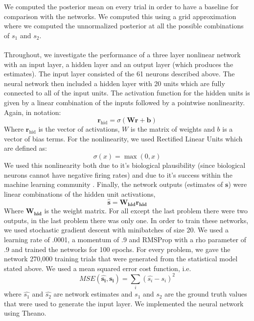 \documentclass{article} %
\begin{document}
We computed the posterior mean on every trial in order to have a baseline for comparison with the networks. We computed this using a grid approximation where we computed the unnormalized posterior at all the possible combinations of $s_1$ and $s_2$.
\\
\\
Throughout, we investigate the performance of a three layer nonlinear network with an input layer, a hidden layer and an output layer (which produces the estimates). The input layer consisted of the 61 neurons described above. The neural network then included a hidden layer with 20 units which are fully connected to all of the input units. The activation function for the hidden units is given by a linear combination of the inputs followed by a pointwise nonlinearity. Again, in notation:
\begin{equation}
	\mathbf{r}_{\text{hid}} = \sigma(\mathbf{Wr + b})
\end{equation}
Where $\mathbf{r}_{\text{hid}}$ is the vector of activations, $W$ is the matrix of weights and $b$ is a vector of bias terms. For the nonlinearity, we used Rectified Linear Units \cite{NairH10} which are defined as:
\begin{equation}
	\sigma(x) = \max(0, x)
\end{equation}
We used this nonlinearity both due to it's biological plausibility (since biological neurons cannot have negative firing rates) and due to it's success within the machine learning community \cite{Maas2013}.
Finally, the network outputs (estimates of $\mathbf{s}$) were linear combinations of the hidden unit activations,  
\begin{equation}
	\mathbf{\hat{s}} = \mathbf{W_{\text{hid}} r_{\text{hid}}}
\end{equation}
Where $\mathbf{W_{\text{hid}}}$ is the weight matrix. For all except the last problem there were two outputs, in the last problem there was only one. 
In order to train these networks, we used stochastic gradient descent with minibatches of size 20. We used a learning rate of .0001, a momentum of .9 \cite{Sutskever2013} and RMSProp \cite{Tieleman2012} with a rho parameter of .9 and trained the networks for 100 epochs. For every problem, we gave the network 270,000 training trials that were generated from the statistical model stated above. We used a mean squared error cost function, i.e. 
\begin{equation}
	MSE(\mathbf{\hat{s_i}, s_i}) = \sum_i(\hat{s_i} - s_i)^2 
\end{equation}
where $\hat{s_1}$ and $\hat{s_2}$ are network estimates and $s_1$ and $s_2$ are the ground truth values that were used to generate the input layer.
We implemented the neural network using Theano.
\\
\\
\end{document}
